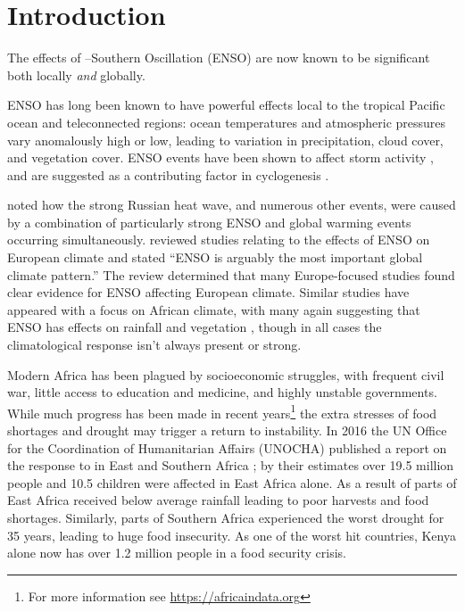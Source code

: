 \section{Introduction}

The effects of \elnino{}--Southern Oscillation (ENSO) are now known to be
significant both locally \emph{and} globally.

ENSO has long been known to have powerful effects local to the tropical Pacific
ocean and teleconnected regions: ocean temperatures and atmospheric pressures
vary anomalously high or low, leading to variation in precipitation, cloud
cover, and vegetation cover. ENSO events have been shown to affect storm
activity \citep{wang2002}, and are suggested as a contributing factor in
cyclogenesis \citep{sobel2000}.

\cite{trenberth2012} noted how the strong Russian heat wave, and numerous
other events, were caused by a combination of particularly strong ENSO and
global warming events occurring simultaneously. \cite{bronnimann2007} reviewed
studies relating to the effects of ENSO on European climate and stated ``ENSO is
arguably the most important global climate pattern.'' The review determined that
many Europe-focused studies found clear evidence for ENSO affecting European
climate. Similar studies have appeared with a focus on African climate, with
many again suggesting that ENSO has effects on rainfall \citep{kane2009} and
vegetation \citep{anyamba1996, anyamba2001, anyamba2002}, though in all cases
the climatological response isn't always present or strong.

\vspace{0.5cm}

Modern Africa has been plagued by socioeconomic struggles, with frequent civil
war, little access to education and medicine, and highly unstable
governments. While much progress has been made in recent years\footnote{For more
  information see \url{https://africaindata.org}} the extra stresses of food
shortages and drought may trigger a return to instability.
In 2016 the UN Office for the Coordination of Humanitarian Affairs (UNOCHA)
published a report on the response to \elnino{} in East and Southern Africa
\citep{unocha2016}; by their estimates over 19.5 million people and 10.5
children were affected in East Africa alone. As a result of \elnino{} parts of
East Africa received below average rainfall leading to poor harvests and food
shortages. Similarly, parts of Southern Africa experienced the worst drought for
35 years, leading to huge food insecurity. As one of the worst hit countries,
Kenya alone now has over 1.2 million people in a food security crisis.


